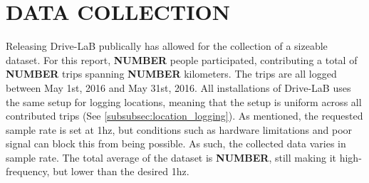 \section{DATA COLLECTION}\label{sec:datacollection}
Releasing Drive-LaB publically has allowed for the collection of a sizeable dataset. For this report, \textbf{NUMBER} people participated, contributing a total of \textbf{NUMBER} trips spanning \textbf{NUMBER} kilometers. The trips are all logged between May 1st, 2016 and May 31st, 2016. All installations of Drive-LaB uses the same setup for logging locations, meaning that the setup is uniform across all contributed trips (See \ref{subsubsec:location_logging}). As mentioned, the requested sample rate is set at 1hz, but conditions such as hardware limitations and poor signal can block this from being possible. As such, the collected data varies in sample rate. The total average of the dataset is \textbf{NUMBER}, still making it high-frequency, but lower than the desired 1hz.